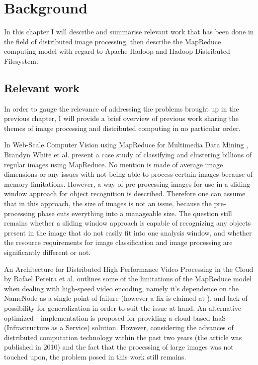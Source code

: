 \documentclass [12pt,a4paper]{report}
\begin{document}
\chapter{Background}

In this chapter I will describe and summarise relevant work that has been done in the field of distributed image processing, then describe the MapReduce computing model with regard to Apache Hadoop and Hadoop Distributed Filesystem.

\section{Relevant work}

In order to gauge the relevance of addressing the problems brought up in the previous chapter, I will provide a brief overview of previous work sharing the themes of image processing and distributed computing in no particular order. 

In Web-Scale Computer Vision using MapReduce for Multimedia Data Mining \cite{White:2010:WCV:1814245.1814254}, Brandyn White et al. present a case study of classifying and clustering billions of regular images using MapReduce. No mention is made of average image dimensions or any issues with not being able to process certain images because of memory limitations. However, a way of pre-processing images for use in a sliding-window approach for object recognition is described. Therefore one can assume that in this approach, the size of images is not an issue, because the pre-processing phase cuts everything into a manageable size. The question still remains whether a sliding window approach is capable of recognizing any objects present in the image that do not easily fit into one analysis window, and whether the resource requirements for image classification and image processing are significantly different or not.

An Architecture for Distributed High Performance Video Processing in the Cloud \cite{Pereira:2010:ADH:1844768.1845374} by Rafael Pereira et al. outlines some of the limitations of the MapReduce model when dealing with high-speed video encoding, namely it's dependence on the NameNode as a single point of failure (however a fix is claimed at \cite{website:facebook_namenode_improvements}), and lack of possibility for generalization in order to suit the issue at hand. An alternative - optimized - implementation is proposed for providing a cloud-based IaaS (Infrastructure as a Service) solution. However, considering the advances of distributed computation technology within the past two years (the article was published in 2010) and the fact that the processing of large images was not touched upon, the problem posed in this work still remains.
\end{document}
